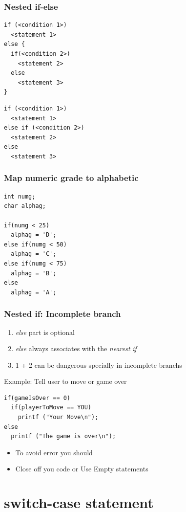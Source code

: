 \documentclass{../c-lecture}
\begin{document}
\begin{frame}[fragile]
  \frametitle{Nested if-else}
  \begin{verbatim}
if (<condition 1>)
  <statement 1>
else {
  if(<condition 2>)
    <statement 2>
  else
    <statement 3>
}
  \end{verbatim}
  \begin{verbatim}
if (<condition 1>)
  <statement 1>
else if (<condition 2>)
  <statement 2>
else
  <statement 3>
  \end{verbatim}
\end{frame}

\begin{frame}[fragile]
  \frametitle{Map numeric grade to alphabetic}
  \begin{verbatim}
int numg;
char alphag;

if(numg < 25)
  alphag = 'D';
else if(numg < 50)
  alphag = 'C';
else if(numg < 75)
  alphag = 'B';
else
  alphag = 'A';
  \end{verbatim}
\end{frame}

\begin{frame}[fragile]
  \frametitle{Nested if: Incomplete branch}
  \begin{enumerate}
    \item \textit{\color{Orange} else} part is optional
    \item
      \textit{\color{Orange} else} always associates with the
      \textit{\color{LimeGreen} nearest}
      \textit{\color{Orange} if}

    \item 1 + 2 can be dangerous specially in incomplete branchs
  \end{enumerate}
  Example: Tell user to move or game over
  \begin{verbatim}
if(gameIsOver == 0)
  if(playerToMove == YOU)
    printf ("Your Move\n");
else
  printf ("The game is over\n");
  \end{verbatim}
  \begin{itemize}
    \item To avoid error you should
    \item Close off you code or Use Empty statements
  \end{itemize}
\end{frame}

\section{switch-case statement}
\end{document}
